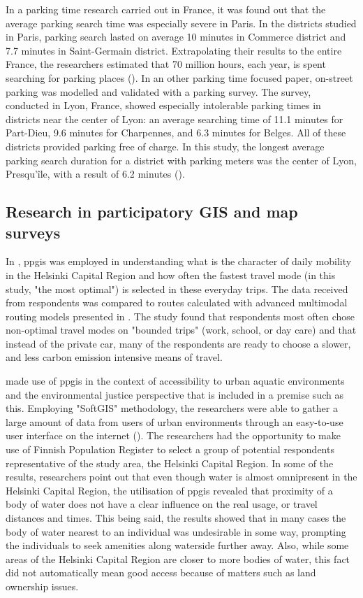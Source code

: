 In a parking time research carried out in France, it was found out that the average parking search time was especially severe in Paris. In the districts studied in Paris, parking search lasted on average 10 minutes in Commerce district and 7.7 minutes in Saint-Germain district. Extrapolating their results to the entire France, the researchers estimated that 70 million hours, each year, is spent searching for parking places (\cite{Gantelet2006}). In an other parking time focused paper, on-street parking was modelled and validated with a parking survey. The survey, conducted in Lyon, France, showed especially intolerable parking times in districts near the center of Lyon: an average searching time of 11.1 minutes for Part-Dieu, 9.6 minutes for Charpennes, and 6.3 minutes for Belges. All of these districts provided parking free of charge. In this study, the longest average parking search duration for a district with parking meters was the center of Lyon, Presqu'île, with a result of 6.2 minutes (\cite{Belloche2015}).

\newpage
\subsection{Research in participatory GIS and map surveys}
\justify

In , \acrfull{ppgis} was employed in understanding what is the character of daily mobility in the Helsinki Capital Region and how often the fastest travel mode (in this study, "the most optimal") is selected in these everyday trips. The data received from respondents was compared to routes calculated with advanced multimodal routing models presented in . The study found that respondents most often chose non-optimal travel modes on "bounded trips" (work, school, or day care) and that instead of the private car, many of the respondents are ready to choose a slower, and less carbon emission intensive means of travel.

 made use of \acrshort{ppgis} in the context of accessibility to urban aquatic environments and the environmental justice perspective that is included in a premise such as this. Employing "SoftGIS" methodology, the researchers were able to gather a large amount of data from users of urban environments through an easy-to-use user interface on the internet (\cite{Kytta2011}). The researchers had the opportunity to make use of Finnish Population Register to select a group of potential respondents representative of the study area, the Helsinki Capital Region. In some of the results, researchers point out that even though water is almost omnipresent in the Helsinki Capital Region, the utilisation of \acrshort{ppgis} revealed that proximity of a body of water does not have a clear influence on the real usage, or travel distances and times. This being said, the results showed that in many cases the body of water nearest to an individual was undesirable in some way, prompting the individuals to seek amenities along waterside further away. Also, while some areas of the Helsinki Capital Region are closer to more bodies of water, this fact did not automatically mean good access because of matters such as land ownership issues.

